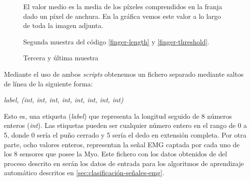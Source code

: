 \begin{figure}[htp]
  \caption{El valor medio es la media de los píxeles comprendidos en la franja dado un píxel de anchura. En la gráfica vemos este valor a lo largo de toda la imagen adjunta.}
\label{fig:finger-length-1}
\end{figure}


\begin{figure}[htp]
  \caption{Segunda muestra del código \ref{finger-length} y \ref{finger-threshold}.}
\label{fig:finger-length-2}
\end{figure}



\begin{figure}[htp]
  \caption{Tercera y última muestra}
\label{fig:finger-length-3}
\end{figure}

\newpage


Mediante el uso de ambos \textit{scripts} obtenemos un fichero separado mediante saltos de línea de la
siguiente forma:

\begin{center}
\textit{label, (int, int, int, int, int, int, int, int)}
\end{center}

Esto es, una etiqueta (\textit{label}) que representa la longitud seguido de 8 números enteros (\textit{int}).
Las etiquetas pueden ser cualquier número entero en el rango de 0 a 5, donde 0 sería el puño cerrado y 5 sería
el dedo en extensión completa. Por otra parte, ocho valores enteros, representan la señal EMG captada por cada
uno de los 8 sensores que posee la Myo. Este fichero con los datos obtenidos de del proceso descrito en %
serán los datos de entrada para los algoritmos de aprendizaje automático descritos en \ref{sec:clasificación-señales-emg}.








%
%
%
%
%
%
%
%


